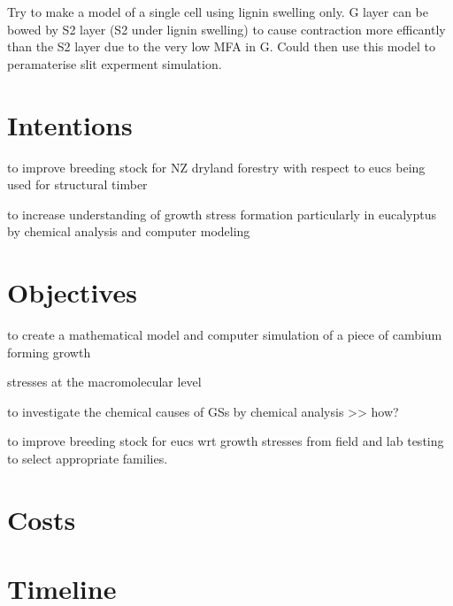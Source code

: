 \documentclass{article}
\begin{document}
Try to make a model of a single cell using lignin swelling only. G layer can be
bowed by S2 layer (S2 under lignin swelling) to cause contraction more
efficantly than the S2 layer due to the very low MFA in G. Could then use this
model to peramaterise slit experment simulation.

\section{Intentions}
to improve breeding stock for NZ dryland forestry with respect to eucs being used for structural timber

to increase understanding of growth stress formation particularly in eucalyptus
by chemical analysis and computer modeling

\section{Objectives}

to create a mathematical model and computer simulation of a piece of cambium forming growth

stresses at the macromolecular level

to investigate the chemical causes of GSs by chemical analysis >> how?

to improve breeding stock for eucs wrt growth stresses from field and lab testing to select appropriate families.

\section{Costs}

\section{Timeline}
\end{document}
